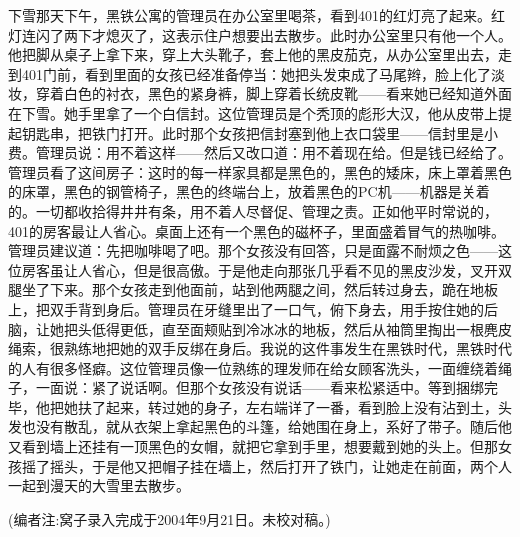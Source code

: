 下雪那天下午，黑铁公寓的管理员在办公室里喝茶，看到401的红灯亮了起来。红灯连闪了两下才熄灭了，这表示住户想要出去散步。此时办公室里只有他一个人。他把脚从桌子上拿下来，穿上大头靴子，套上他的黑皮茄克，从办公室里出去，走到401门前，看到里面的女孩已经准备停当：她把头发束成了马尾辫，脸上化了淡妆，穿着白色的衬衣，黑色的紧身裤，脚上穿着长统皮靴——看来她已经知道外面在下雪。她手里拿了一个白信封。这位管理员是个秃顶的彪形大汉，他从皮带上提起钥匙串，把铁门打开。此时那个女孩把信封塞到他上衣口袋里——信封里是小费。管理员说：用不着这样——然后又改口道：用不着现在给。但是钱已经给了。管理员看了这间房子：这时的每一样家具都是黑色的，黑色的矮床，床上罩着黑色的床罩，黑色的钢管椅子，黑色的终端台上，放着黑色的PC机——机器是关着的。一切都收拾得井井有条，用不着人尽督促、管理之责。正如他平时常说的，401的房客最让人省心。桌面上还有一个黑色的磁杯子，里面盛着冒气的热咖啡。管理员建议道：先把咖啡喝了吧。那个女孩没有回答，只是面露不耐烦之色——这位房客虽让人省心，但是很高傲。于是他走向那张几乎看不见的黑皮沙发，叉开双腿坐了下来。那个女孩走到他面前，站到他两腿之间，然后转过身去，跪在地板上，把双手背到身后。管理员在牙缝里出了一口气，俯下身去，用手按住她的后脑，让她把头低得更低，直至面颊贴到冷冰冰的地板，然后从袖筒里掏出一根麂皮绳索，很熟练地把她的双手反绑在身后。我说的这件事发生在黑铁时代，黑铁时代的人有很多怪癖。这位管理员像一位熟练的理发师在给女顾客洗头，一面缠绕着绳子，一面说：紧了说话啊。但那个女孩没有说话——看来松紧适中。等到捆绑完毕，他把她扶了起来，转过她的身子，左右端详了一番，看到脸上没有沾到土，头发也没有散乱，就从衣架上拿起黑色的斗篷，给她围在身上，系好了带子。随后他又看到墙上还挂有一顶黑色的女帽，就把它拿到手里，想要戴到她的头上。但那女孩摇了摇头，于是他又把帽子挂在墙上，然后打开了铁门，让她走在前面，两个人一起到漫天的大雪里去散步。 


(编者注:窝子录入完成于2004年9月21日。未校对稿。)
